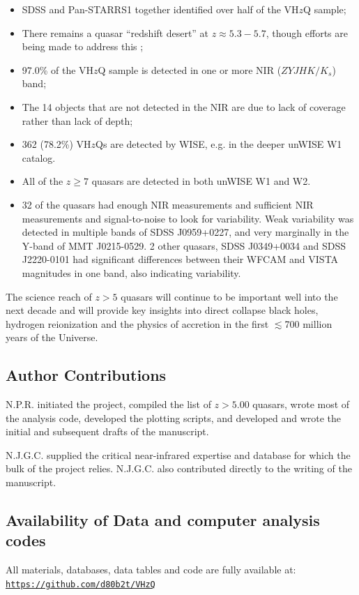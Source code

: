 \documentclass[usenatbib]{mnras}
\begin{document}
\begin{itemize}
    \item SDSS and Pan-STARRS1 together identified over half of the VH$z$Q sample;  
    \item There remains a quasar ``redshift desert'' at $z\approx5.3-5.7$, though 
      efforts are being made to address this \citep[e.g.,][]{YangJ2018a};
    \item 97.0\% of the VH$z$Q sample is detected in one or more NIR ($ZYJHK/K_{s}$) band; 
    \item The 14 objects that are not detected in the NIR are due to lack of coverage rather than lack of depth; 
   \item 362 (78.2\%) VH$z$Qs are detected by WISE, e.g. in the deeper unWISE W1 catalog. 
 \item All of the $z\geq7$ quasars are detected in both unWISE W1 and W2. 
 \item 32 of the quasars had enough NIR measurements and sufficient NIR measurements and signal-to-noise to look for variability. Weak variability was detected in multiple bands of SDSS J0959+0227, and very marginally in the Y-band of MMT J0215-0529. 2 other quasars, SDSS J0349+0034 and SDSS J2220-0101 had significant differences between their WFCAM and VISTA magnitudes in one band, also indicating variability. 
\end{itemize}

The science reach of $z>5$ quasars will continue to be important well
into the next decade \citep{Becker2019_DecadalWP, Fan2019_DecadalWP,
Wang2019_DecadalWP} and will provide key insights into direct collapse
black holes, hydrogen reionization and the physics of accretion in the
first $\lesssim$700 million years of the Universe.



\subsection*{Author Contributions}   
N.P.R. initiated the project, compiled the list of $z>5.00$ quasars, wrote most of the analysis code, developed the plotting scripts, and developed and wrote the initial and subsequent drafts of the manuscript.

N.J.G.C. supplied the critical near-infrared expertise and database for which the bulk of the project relies. N.J.G.C. also contributed directly to the writing of the manuscript.



\subsection*{Availability of Data and computer analysis codes} 
All materials, databases, data tables and code are fully available at: 
\href{https://github.com/d80b2t/VHzQ}{\tt https://github.com/d80b2t/VHzQ}
\end{document}

